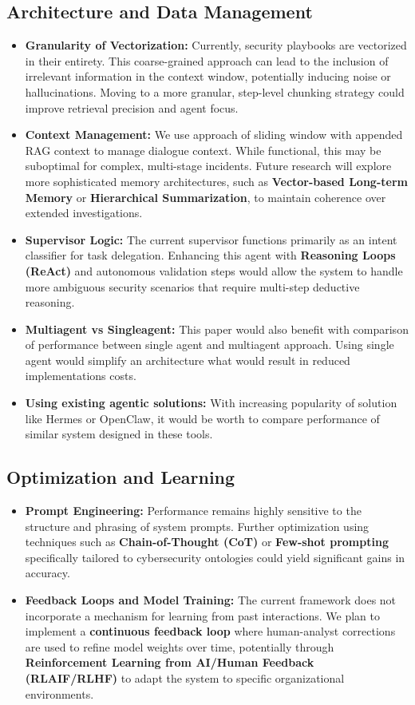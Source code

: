 \documentclass[conference]{IEEEtran}
\begin{document}
\subsection{Architecture and Data Management}
\begin{itemize}
    \item \textbf{Granularity of Vectorization:} Currently, security playbooks are vectorized in their entirety. This coarse-grained approach can lead to the inclusion of irrelevant information in the context window, potentially inducing noise or hallucinations. Moving to a more granular, step-level chunking strategy could improve retrieval precision and agent focus.
    \item \textbf{Context Management:} We use approach of sliding window with appended RAG context to manage dialogue context. While functional, this may be suboptimal for complex, multi-stage incidents. Future research will explore more sophisticated memory architectures, such as \textbf{Vector-based Long-term Memory} or \textbf{Hierarchical Summarization}, to maintain coherence over extended investigations.
    \item \textbf{Supervisor Logic:} The current supervisor functions primarily as an intent classifier for task delegation. Enhancing this agent with \textbf{Reasoning Loops (ReAct)} and autonomous validation steps would allow the system to handle more ambiguous security scenarios that require multi-step deductive reasoning.
    \item \textbf{Multiagent vs Singleagent:} This paper would also benefit with comparison of performance between single agent and multiagent approach. Using single agent would simplify an architecture what would result in reduced implementations costs.
    \item \textbf{Using existing agentic solutions:} With increasing popularity of solution like Hermes or OpenClaw, it would be worth to compare performance of similar system designed in these tools.
\end{itemize}

\subsection{Optimization and Learning}
\begin{itemize}
    \item \textbf{Prompt Engineering:} Performance remains highly sensitive to the structure and phrasing of system prompts. Further optimization using techniques such as \textbf{Chain-of-Thought (CoT)} or \textbf{Few-shot prompting} specifically tailored to cybersecurity ontologies could yield significant gains in accuracy.
    \item \textbf{Feedback Loops and Model Training:} The current framework does not incorporate a mechanism for learning from past interactions. We plan to implement a \textbf{continuous feedback loop} where human-analyst corrections are used to refine model weights over time, potentially through \textbf{Reinforcement Learning from AI/Human Feedback (RLAIF/RLHF)} to adapt the system to specific organizational environments.
\end{itemize}
\end{document}
